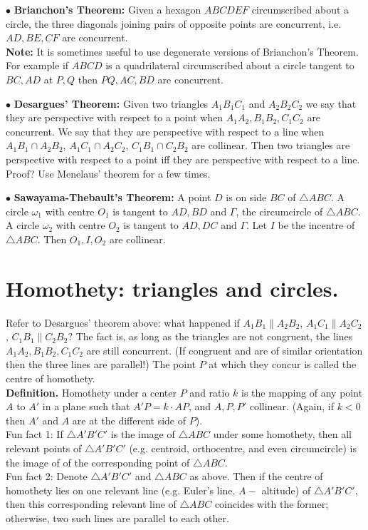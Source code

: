 \documentclass[11pt,a4paper]{article}
\begin{document}
$\bullet$ \textbf {Brianchon's Theorem:} Given a hexagon $ABCDEF$ circumscribed about a circle, the three diagonals joining pairs of opposite points are concurrent, i.e. $AD,BE,CF$ are concurrent.\\
\textbf{Note:} It is sometimes useful to use degenerate versions of Brianchon's Theorem. For example if $ABCD$ is a quadrilateral circumscribed about a circle tangent to $BC, AD$ at $P,Q$ then $PQ,AC,BD$ are concurrent.

$\bullet$ \textbf {Desargues' Theorem:} Given two triangles $A_1B_1C_1$ and $A_2B_2C_2$ we say that they are perspective with respect to a point when $A_1A_2, B_1B_2, C_1C_2$ are concurrent. We say that they are perspective with respect to a line when $A_1B_1 \cap A_2B_2$, $A_1C_1\cap A_2C_2$, $C_1B_1\cap C_2B_2$ are collinear. Then two triangles are perspective with respect to a point iff they are perspective with respect to a line. Proof? Use Menelaus' theorem for a few times.

$\bullet$ \textbf {Sawayama-Thebault's Theorem:} A point $D$ is on side $BC$ of $\triangle ABC$. A circle $\omega_1$ with centre $O_1$ is tangent to $AD,BD$ and $\Gamma$, the circumcircle of $\triangle ABC$. A circle $\omega_2$ with centre $O_2$ is tangent to $AD,DC$ and $\Gamma$. Let $I$ be the incentre of $\triangle ABC$. Then $O_1, I, O_2$ are collinear.

\section {Homothety: triangles and circles.}

Refer to Desargues' theorem above: what happened if $A_1B_1 \parallel A_2B_2$, $A_1C_1\parallel A_2C_2$, $C_1B_1\parallel C_2B_2?$ The fact is, as long as the triangles are not congruent, the lines $A_1A_2, B_1B_2, C_1C_2$ are still concurrent. (If congruent and are of similar orientation then the three lines are parallel!) The point $P$ at which they concur is called the centre of homothety.\\
\textbf {Definition.} Homothety under a center $P$ and ratio $k$ is the mapping of any point $A$ to $A'$ in a plane such that $A'P=k\cdot AP$, and $A, P, P'$ collinear. (Again, if $k<0$ then $A'$ and $A$ are at the different side of $P$).\\
Fun fact 1: If $\triangle A'B'C'$ is the image of $\triangle ABC$ under some homothety, then all relevant points of $\triangle A'B'C'$ (e.g. centroid, orthocentre, and even circumcircle) is the image of of the corresponding point of $\triangle ABC$.\\
Fun fact 2: Denote $\triangle A'B'C'$ and $\triangle ABC$ as above. Then if the centre of homothety lies on one relevant line (e.g. Euler's line, $A-$ altitude) of $\triangle A'B'C'$, then this corresponding relevant line of $\triangle ABC$ coincides with the former; otherwise, two such lines are parallel to each other.
\end{document}

